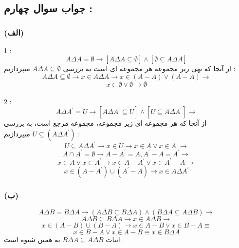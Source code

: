 \documentclass{article}
\begin{document}
        \subsection*{جواب سوال چهارم :}
            \subsubsection*{(الف)}
                1 : \[A \Delta A = \emptyset \rightarrow [A \Delta A \subseteq \emptyset] \land [\emptyset \subseteq A \Delta A]\]
                از آنجا که تهی زیر مجموعه هر مجموعه ای است به بررسی $A \Delta A \subseteq \emptyset$ میپردازیم : \\
                \[A \Delta A \subseteq \emptyset \rightarrow x \in A \Delta A \rightarrow x \in (A - A) \lor (A - A) \rightarrow\]
                \[x \in \emptyset \lor \emptyset \rightarrow \emptyset\]
                \\
                2 : \[A \Delta A^{\prime} = U \rightarrow [A \Delta A^{\prime} \subseteq U] \land [U \subseteq A \Delta A^{\prime}] \rightarrow\]
                از آنجا که هر مجموعه ای زیر مجموعه، مجموعه مرجع است، به بررسی $U \subseteq (A \Delta A^{\prime})$ میپردازیم : \\
                \[U \subseteq A \Delta A^{\prime} \rightarrow x \in U \rightarrow x \in A \lor x \in A^{\prime} \rightarrow\]
                \[A \cap A^{\prime} = \emptyset \rightarrow A - A^{\prime} = A, A^{\prime} - A = A^{\prime} \rightarrow\]
                \[x \in A \lor x \in A^{\prime} \rightarrow x \in A - A^{\prime} \lor x \in A^{\prime} - A \rightarrow\]
                \[x \in (A - A^{\prime}) \cup (A^{\prime} - A) \rightarrow x \in A \Delta A^{\prime}\]
            
            \subsubsection*{(ب)}
                \[A \Delta B = B \Delta A \rightarrow (A \Delta B \subseteq B \Delta A) \land (B \Delta A \subseteq A \Delta B) \rightarrow\]
                \[A \Delta B \subseteq B \Delta A \rightarrow x \in A \Delta B \rightarrow\]
                \[x \in (A - B) \cup (B - A) \rightarrow x \in A - B \lor x \in B - A \equiv\]
                \[x \in B - A \lor x \in A - B \equiv x \in B \Delta A\]
                اثبات $B \Delta A \subseteq A \Delta B$ به همین شیوه است.
            
\end{document}
